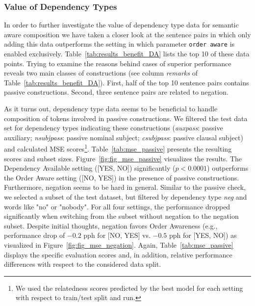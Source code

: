 
\subsubsection{Value of Dependency Types}
In order to further investigate the value of dependency type data for semantic aware composition we have taken a closer look at the sentence pairs in which only adding this data outperforms the setting in which parameter \texttt{order aware} is enabled exclusively. Table~\ref{tab:results_benefit_DA} lists the top 10 of these data points. Trying to examine the reasons behind cases of superior performance reveals two main classes of constructions (see column \textit{remarks} of Table~\ref{tab:results_benefit_DA}). First, half of the top 10 sentence pairs contains passive constructions. Second, three sentence pairs are related to negation. 

As it turns out, dependency type data seems to be beneficial to handle composition of tokens involved in passive constructions. We filtered the test data set for dependency types indicating these constructions (\textit{auxpass}: passive auxiliary; \textit{nsubjpass}: passive nominal subject; \textit{csubjpass}: passive clausal subject) and calculated \ac{MSE} scores\footnote{We used the relatedness scores predicted by the best model for each setting with respect to train/test split and run.}. Table~\ref{tab:mse_passive} presents the resulting scores and subset sizes. Figure~\ref{fig:fig_mse_passive} visualizes the results. The Dependency Available setting ([YES, NO]) significantly ($p < 0.0001$) outperforms the Order Aware setting ([NO, YES]) in the presence of passive constructions. Furthermore, negation seems to be hard in general. Similar to the passive check, we selected a subset of the test dataset, but filtered by dependency type \textit{neg} and words like "no" or "nobody". For all four settings, the performance dropped significantly when switching from the subset without negation to the negation subset. Despite initial thoughts, negation favors Order Awareness (e.g., performance drop of $-0.2$ pph for [NO, YES] vs. $-0.5$ pph for [YES, NO]) as visualized in Figure~\ref{fig:fig_mse_negation}. Again, Table~\ref{tab:mse_passive} displays the specific evaluation scores and, in addition, relative performance differences with respect to the considered data split.

